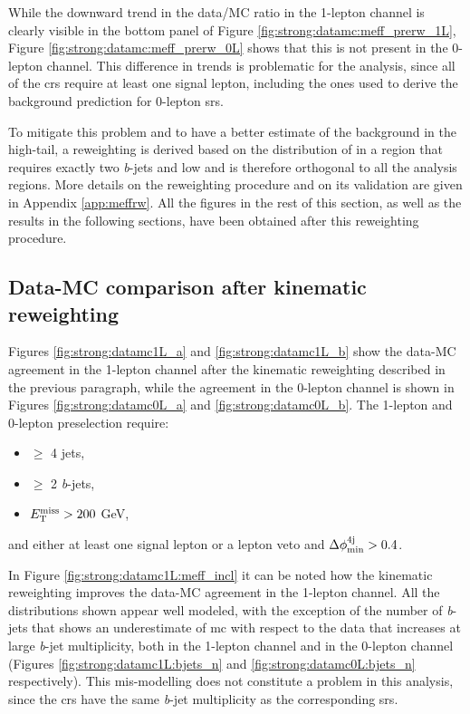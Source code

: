While the downward trend in the data/MC ratio in the 1-lepton channel is clearly visible in the bottom panel of Figure \ref{fig:strong:datamc:meff_prerw_1L},
Figure \ref{fig:strong:datamc:meff_prerw_0L} shows that this is not present in the 0-lepton channel.
This difference in trends is problematic for the analysis, since all of the \glspl{cr} require at least one signal lepton, 
including the ones used to derive the background prediction for 0-lepton \glspl{sr}. 

To mitigate this problem and to have a better estimate of the background in the high-\meff tail, a reweighting is derived 
based on the distribution of \meff in a region that requires exactly two \textit{b}-jets and low \mtb and is therefore
 orthogonal to all the analysis regions. More details on the reweighting procedure and on its validation are given in Appendix \ref{app:meffrw}.
All the figures in the rest of this section, as well as the results in the following sections, 
have been obtained after this reweighting procedure.


\subsection{Data-MC comparison after kinematic reweighting}

Figures \ref{fig:strong:datamc1L_a} and \ref{fig:strong:datamc1L_b} show the data-MC agreement in the 1-lepton channel after the 
kinematic reweighting described in the previous paragraph, while 
the agreement in the 0-lepton channel is shown in Figures \ref{fig:strong:datamc0L_a} and \ref{fig:strong:datamc0L_b}.
The 1-lepton and 0-lepton preselection require:
\begin{itemize}
\item $\geq$ 4 jets,
\item $\geq$ 2 \textit{b}-jets,
\item $E_{\rm T}^{\mathrm{miss}} > 200$ GeV, 
\end{itemize}
and either at least one signal lepton or a lepton veto and $\Delta\phi_{\rm{min}}^{4{\rm{j}}} > 0.4$.

In Figure \ref{fig:strong:datamc1L:meff_incl} it can be noted how the kinematic reweighting improves the data-MC agreement in
the 1-lepton channel. 
All the distributions shown appear well modeled, with the exception of the number of \textit{b}-jets 
that shows an underestimate of \gls{mc} with respect to the data that increases at large \textit{b}-jet multiplicity, both in 
the 1-lepton channel and in the 0-lepton channel 
(Figures \ref{fig:strong:datamc1L:bjets_n} and \ref{fig:strong:datamc0L:bjets_n} respectively).
This mis-modelling does not constitute a problem in this analysis, 
since the \glspl{cr} have the same \textit{b}-jet multiplicity as the corresponding \glspl{sr}.



